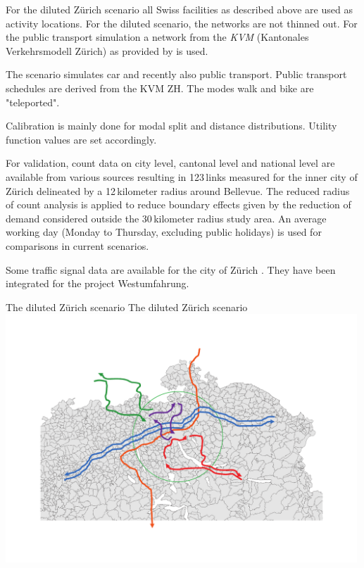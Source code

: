For the diluted Zürich scenario all Swiss facilities as described above are used as activity locations. For the diluted scenario, the networks are not thinned out. For the public transport simulation a network from the \emph{KVM} (Kantonales Verkehrsmodell Zürich) as provided by \citet[][]{AMV_Webpage_2011} is used. 

The scenario simulates car and recently also public transport. Public transport schedules are derived from the KVM ZH. The modes walk and bike are "teleported". 

Calibration is mainly done for modal split and distance distributions. Utility function values are set accordingly.

For validation, count data on city level, cantonal level and national level \citep[][]{ASTRA_Webpage_2006} are available from various sources resulting in 123\,links measured for the inner city of Zürich delineated by a 12\,kilometer radius around Bellevue. The reduced radius of count analysis is applied to reduce boundary effects given by the reduction of demand considered outside the 30\,kilometer radius study area. An average working day (Monday to Thursday, excluding public holidays) is used for comparisons in current scenarios.

Some traffic signal data are available for the city of Zürich \citep[][]{STAPOZH-DAV_unpub_gtZH_2008}. They have been integrated for the project Westumfahrung.

\createfigure%
{The diluted Zürich scenario}%
{The diluted Zürich scenario}%
{\label{fig:zurichScenario}}%
{\includegraphics[width=0.99\textwidth, angle=0]{using/figures/zh.pdf}}%
{}

